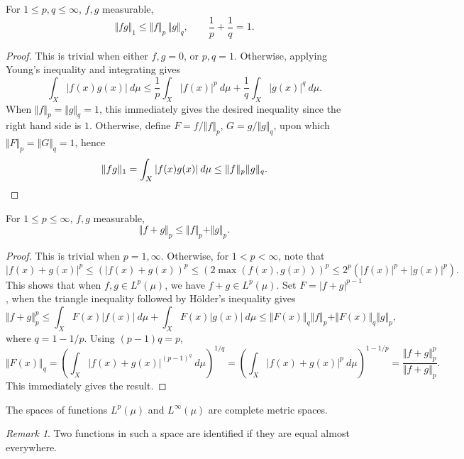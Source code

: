 \documentclass[11pt]{article}
\newcommand{\norm}[1]{\Vert #1 \Vert}
\theoremstyle{definition}
\theoremstyle{remark}
\newtheorem*{remark}{Remark}
\numberwithin{equation}{section}
\begin{document}
    \begin{lemma}[H\"older]
        For $1 \leq p, q \leq \infty$, $f, g$ measurable, \[
            \norm{fg}_1 \leq \norm{f}_p\, \norm{g}_q, \qquad \frac{1}{p}
            + \frac{1}{q} = 1.
        \] 
    \end{lemma}
    \begin{proof}
        This is trivial when either $f, g = 0$, or $p, q = 1$.  Otherwise, applying
        Young's inequality and integrating gives
        \[
            \int_X |f(x)g(x)|\:d\mu \leq \frac{1}{p}\int_X |f(x)|^p\:d\mu +
            \frac{1}{q}\int_X |g(x)|^q\:d\mu.
        \] When $\norm{f}_p = \norm{g}_q = 1$, this immediately gives the desired
        inequality since the right hand side is $1$. Otherwise, define $F = f /
        \norm{f}_p$, $G = g / \norm{g}_q$, upon which $\norm{F}_p = \norm{G}_q = 1$,
        hence \[
            \norm{fg}_1 = \int_X |f(x)g(x)|\:d\mu \leq \norm{f}_p\norm{g}_q. \qedhere
        \] 
    \end{proof}
    
    \begin{lemma}[Minkowski]
        For $1 \leq p \leq \infty$, $f, g$ measurable, \[
            \norm{f + g}_p \leq \norm{f}_p + \norm{g}_p.
        \] 
    \end{lemma}
    \begin{proof}
        This is trivial when $p = 1, \infty$. Otherwise, for $1 < p < \infty$, note
        that \[
            |f(x) + g(x)|^p \leq \left(|f(x) + g(x)\right)^p \leq \left(2\max(f(x),
            g(x))\right)^p \leq 2^p\left(|f(x)|^p + |g(x)|^p\right).
        \] This shows that when $f, g \in L^p(\mu)$, we have $f + g \in L^p(\mu)$.
        Set $F = |f + g|^{p - 1}$, when the triangle inequality followed by
        H\"older's inequality gives \[
            \norm{f + g}_p^p \leq \int_X F(x)|f(x)|\:d\mu + \int_X F(x)|g(x)|\:d\mu
            \leq \norm{F(x)}_q\norm{f}_p + \norm{F(x)}_q\norm{g}_p,
        \] where $q = 1 - 1 /p$. Using $(p - 1)q = p$, \[
            \norm{F(x)}_q = \left(\int_X |f(x) + g(x)|^{(p - 1)^q} \:d\mu\right)^{1 /
            q} = \left(\int_X |f(x) + g(x)|^p \:d\mu\right)^{1 - 1 / p} =
            \frac{\norm{f + g}_p^p}{\norm{f + g}_p}.
        \] This immediately gives the result.
    \end{proof}

    \begin{theorem}
        The spaces of functions $L^p(\mu)$ and $L^\infty(\mu)$ are complete metric
        spaces.
        \begin{remark}
            Two functions in such a space are identified if they are equal almost
            everywhere.
        \end{remark}
    \end{theorem}
\end{document}
